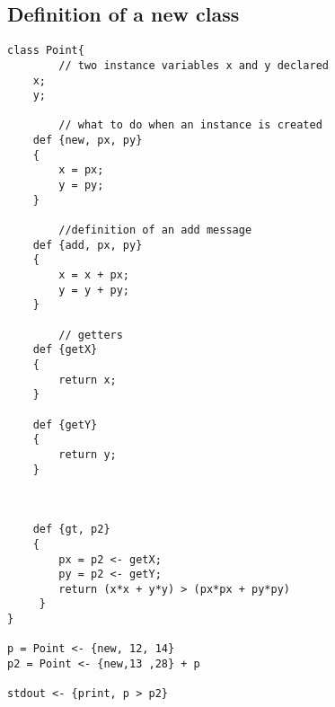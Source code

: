 \documentclass{eplDoc}
\begin{document}
\subsection{Definition of a new class}
\begin{lstlisting}
class Point{
		// two instance variables x and y declared
    x;
    y;

		// what to do when an instance is created
    def {new, px, py}
    {
        x = px;
        y = py;
    }
		
		//definition of an add message
    def {add, px, py}
    {
        x = x + px;
        y = y + py;
    }

		// getters
    def {getX}
    {
        return x;    
    }
    
    def {getY}
    {
        return y;    
    }
		
		
		
    def {gt, p2}
    {
        px = p2 <- getX;    
        py = p2 <- getY;    
        return (x*x + y*y) > (px*px + py*py)
     }
}

p = Point <- {new, 12, 14}
p2 = Point <- {new,13 ,28} + p

stdout <- {print, p > p2}

\end{lstlisting}
\end{document}
